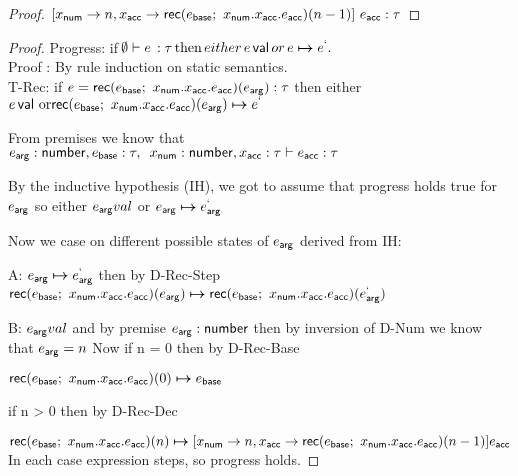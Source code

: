 \documentclass[11pt]{article}
\begin{document}
\begin{proof}

$[x_\msf{num} \rightarrow n, x_\msf{acc} \rightarrow \rec{e_\msf{base}}{x_\msf{num}}{x_\msf{acc}}{e_\msf{acc}}{n-1}] \ e_\msf{acc} : \tau$


\end{proof}

\begin{proof}
Progress: if$\,  \emptyset \vdash e \, : \tau  \, \text{then} \, either\,  e\, \mathsf{val}\, or \, e \boldsymbol{\mapsto} e^{\mathsf{`}}  . $\\
Proof : By rule induction on static semantics.\\

T-Rec: if $e = \mathsf{rec}(e_{\mathsf{base}}; ~ x_{\mathsf{num}}.x_{\mathsf{acc}}.e_{\mathsf{acc}})(e_{\mathsf{arg}}) : \tau$ then either $\steps{e \, \msf{val}$ or\\
                     $\rec{e_\msf{base}}{x_\msf{num}}{x_\msf{acc}}{e_\msf{acc}}{e_\msf{arg}}}{e^\msf{`}}$

From premises we know that\\
$e_{\mathsf{arg}} : \mathsf{number} , e_{\mathsf{base}} : \tau , \, \,\, x_{\mathsf{num}} : \mathsf{number},x_{\mathsf{acc}} : \tau \vdash e_{\mathsf{acc}} : \tau $

By the inductive hypothesis (IH), we got to assume that progress holds true for $e_{\mathsf{arg}}$ so either $e_{\mathsf{arg}} val$ or $e_{\mathsf{arg}} \boldsymbol{\mapsto} e^{`}_{\mathsf{arg}}$

Now we case on different possible states of $e_{\mathsf{arg}}$ derived from IH:

A:  $e_{\mathsf{arg}} \boldsymbol{\mapsto} e^{`}_{\mathsf{arg}}$ then by D-Rec-Step
 $\mathsf{rec}(e_{\mathsf{base}}; ~ x_{\mathsf{num}}.x_{\mathsf{acc}}.e_{\mathsf{acc}})(e_{\mathsf{arg}}) \boldsymbol{\mapsto} \mathsf{rec}(e_{\mathsf{base}}; ~ x_{\mathsf{num}}.x_{\mathsf{acc}}.e_{\mathsf{acc}})(e^{`}_{\mathsf{arg}}) $
 
B: $e_{\mathsf{arg}} val$ and by premise $e_{\mathsf{arg}} : \mathsf{number}$ then by inversion of D-Num we know that $e_{\mathsf{arg}} = n$
 Now if n = 0 then by D-Rec-Base
 
$\mathsf{rec}(e_{\mathsf{base}}; ~ x_{\mathsf{num}}.x_{\mathsf{acc}}.e_{\mathsf{acc}})(0) \boldsymbol{\mapsto} e_{\mathsf{base}} $

if n > 0 then by D-Rec-Dec

$\mathsf{rec}(e_{\mathsf{base}}; ~ x_{\mathsf{num}}.x_{\mathsf{acc}}.e_{\mathsf{acc}})(n) \boldsymbol{\mapsto} [x_{\mathsf{num}} \rightarrow n, x_{\mathsf{acc}} \rightarrow \mathsf{rec}(e_{\mathsf{base}}; ~ x_{\mathsf{num}}.x_{\mathsf{acc}}.e_{\mathsf{acc}})(n-1)] e_{\mathsf{acc}}$\\
In each case expression steps, so progress holds.
\end{proof}
\end{document}
